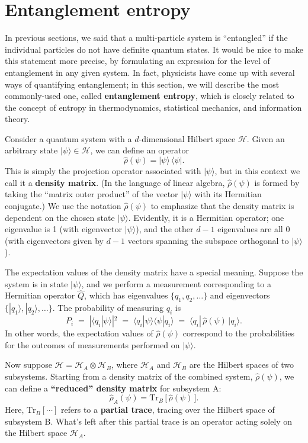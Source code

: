 \documentclass[pra,11pt]{revtex4}
\begin{document}
\section{Entanglement entropy}
\label{sec:entropy}

In previous sections, we said that a multi-particle system is
``entangled'' if the individual particles do not have definite quantum
states.  It would be nice to make this statement more precise, by
formulating an expression for the level of entanglement in any given
system.  In fact, physicists have come up with several ways of
quantifying entanglement; in this section, we will describe the most
commonly-used one, called \textbf{entanglement entropy}, which is
closely related to the concept of entropy in thermodynamics,
statistical mechanics, and information theory.

Consider a quantum system with a $d$-dimensional Hilbert space
$\mathscr{H}$.  Given an arbitrary state $|\psi\rangle \in
\mathscr{H}$, we can define an operator
$$\hat{\rho}(\psi) = |\psi\rangle\, \langle\psi|.$$
This is simply the projection operator associated with $|\psi\rangle$,
but in this context we call it a \textbf{density matrix}.  (In the
language of linear algebra, $\hat{\rho}(\psi)$ is formed by taking the
``matrix outer product'' of the vector $|\psi\rangle$ with its
Hermitian conjugate.)  We use the notation $\hat{\rho}(\psi)$ to
emphasize that the density matrix is dependent on the chosen state
$|\psi\rangle$.  Evidently, it is a Hermitian operator; one eigenvalue
is 1 (with eigenvector $|\psi\rangle$), and the other $d-1$
eigenvalues are all $0$ (with eigenvectors given by $d-1$ vectors
spanning the subspace orthogonal to $|\psi\rangle$).

The expectation values of the density matrix have a special meaning.
Suppose the system is in state $|\psi\rangle$, and we perform a
measurement corresponding to a Hermitian operator $\hat{Q}$, which has
eigenvalues $\{q_1,q_2,\dots\}$ and eigenvectors
$\{|q_1\rangle,|q_2\rangle,\dots\}$.  The probability of
measuring $q_i$ is
$$P_i \;=\; |\langle q_i| \psi\rangle|^2 \;=\; \langle q_i |\psi\rangle \langle \psi|q_i\rangle \;=\; \langle q_i |\, \hat{\rho}(\psi)\, |q_i \rangle.$$
In other words, the expectation values of $\hat{\rho}(\psi)$
correspond to the probabilities for the outcomes of measurements
performed on $|\psi\rangle$.

Now suppose $\mathscr{H} = \mathscr{H}_A \otimes \mathscr{H}_B$, where
$\mathscr{H}_A$ and $\mathscr{H}_B$ are the Hilbert spaces of two
subsystems.  Starting from a density matrix of the combined system,
$\hat{\rho}(\psi)$, we can define a \textbf{``reduced'' density
  matrix} for subsystem A:
$$\hat{\rho}_A(\psi) = \mathrm{Tr}_B \,\big[\,\hat{\rho}(\psi)\,\big].$$
Here, $\mathrm{Tr}_B[\cdots]$ refers to a \textbf{partial trace},
tracing over the Hilbert space of subsystem B.  What's left after
this partial trace is an operator acting solely on the Hilbert space
$\mathscr{H}_A$.
\end{document}
